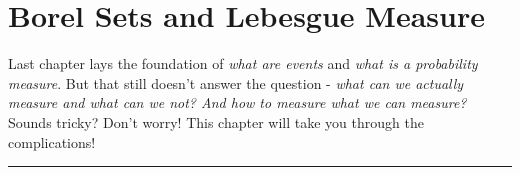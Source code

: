 \chapter{Borel Sets and Lebesgue Measure}

Last chapter lays the foundation of \textit{what are events} and \textit{what is a probability measure}. But that still doesn't answer the question - \textit{what can we actually measure and what can we not? And how to measure what we can measure?} Sounds tricky? Don't worry! This chapter will take you through the complications! 





\vspace{30pt}
\hrule